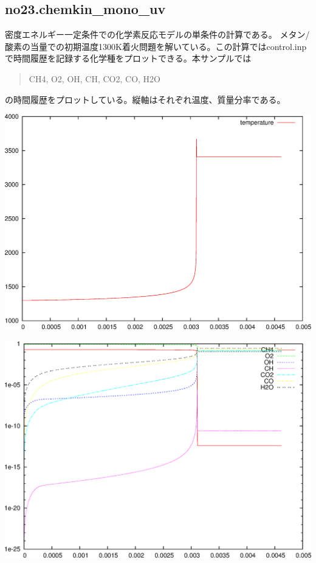 \documentclass{jsarticle}
\begin{document}
\subsection{no23.chemkin\_mono\_uv}%
密度エネルギー一定条件での化学素反応モデルの単条件の計算である。
メタン/酸素の当量での初期温度1300K着火問題を解いている。この計算ではcontrol.inpで時間履歴を記録する化学種をプロットできる。本サンプルでは
\begin{quotation}
CH4, O2, OH, CH, CO2, CO, H2O
\end{quotation}
の時間履歴をプロットしている。縦軸はそれぞれ温度、質量分率である。
\begin{center}
\includegraphics[width=.65\textwidth]{sample/no23.1.eps}
\end{center}

\begin{center}
\includegraphics[width=.65\textwidth]{sample/no23.2.eps}
\end{center}


\end{document}
